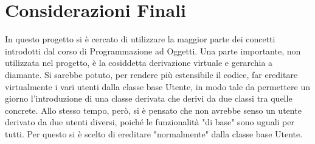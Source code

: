\documentclass[openany, a4paper,11pt] {report}
\begin{document}
\chapter{Considerazioni Finali}

In questo progetto si è cercato di utilizzare la maggior parte dei concetti introdotti dal corso di Programmazione ad Oggetti. Una parte importante, non utilizzata nel progetto, è la cosiddetta \textsf{derivazione virtuale} e gerarchia a diamante. Si sarebbe potuto, per rendere più estensibile il codice, far ereditare virtualmente i vari utenti dalla classe base Utente, in modo tale da permettere un giorno l'introduzione di una classe derivata che derivi da due classi tra quelle concrete.  Allo stesso tempo, però, si è pensato che non avrebbe senso un utente derivato da due utenti diversi, poiché le funzionalità "di base" sono uguali per tutti. Per questo si è scelto di ereditare "normalmente" dalla classe base Utente.
\end{document}
